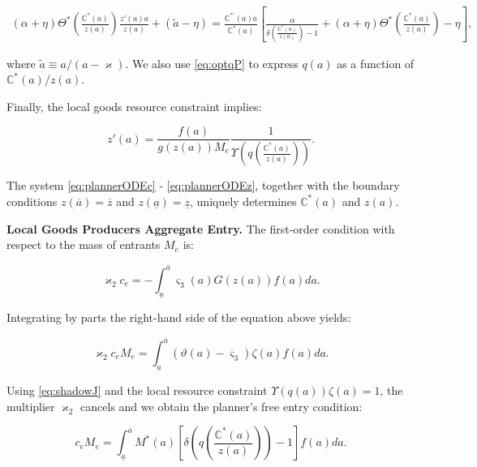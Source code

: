 \begin{align}\label{eq:plannerODEc}
    (\alpha + \eta)\Theta^*\left(\frac{\mathbb{C}^*(a)}{z(a)}\right)\frac{z'(a)a}{z(a)} + (\widetilde{a} - \eta) = \frac{\mathbb{C}^{*'}(a) a}{\mathbb{C}^*(a)} \left[ \frac{\alpha}{\delta\left(\frac{\mathbb{C}^*(a)}{z(a)}\right) - 1} + (\alpha + \eta)\Theta^*\left(\frac{\mathbb{C}^*(a)}{z(a)}\right) - \eta \right],
\end{align}

where $\widetilde{a} \equiv a/(a - \varkappa)$. We also use \eqref{eq:optqP} to express $q(a)$ as a function of $\mathbb{C}^*(a)/z(a)$.  

Finally, the local goods resource constraint implies:

\begin{equation}\label{eq:plannerODEz}
	z'(a) = \frac{f(a)}{g(z(a)) M_e} \frac{1}{\Upsilon\left(q\left(\frac{\mathbb{C}^*(a)}{z(a)}\right)\right)}.
\end{equation} 

The system \eqref{eq:plannerODEc} - \eqref{eq:plannerODEz}, together with the boundary conditions $z(\overline{a}) = \overline{z}$ and $z(\underline{a}) = \underline{z}$, uniquely determines $\mathbb{C}^*(a)$ and $z(a)$. 

\noindent \textbf{Local Goods Producers Aggregate Entry.} 
The first-order condition with respect to the mass of entrants $M_e$ is:

\begin{equation*}
    \varkappa_2 c_e = - \int_{\underline{a}}^{\overline{a}} \varsigma_3(a) G(z(a)) f(a) da.
\end{equation*}

Integrating by parts the right-hand side of the equation above yields:

\begin{equation*}
    \varkappa_2 c_e M_e = \int_{\underline{a}}^{\overline{a}} \left(\vartheta(a) - \overline{\varsigma}_3 \right) \zeta(a) f(a) da.
\end{equation*}

Using \eqref{eq:shadowJ} and the local resource constraint $\Upsilon(q(a))\zeta(a) = 1$, the multiplier $\varkappa_2$ cancels and we obtain the planner’s free entry condition:

\begin{equation}\label{eq:plannEntry}
	c_e M_e = \int_{\underline{a}}^{\overline{a}} M^*(a) \left[\delta\left(q\left(\frac{\mathbb{C}^*(a)}{z(a)}\right)\right) - 1 \right] f(a) da.
\end{equation}


